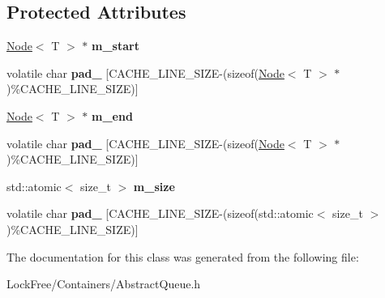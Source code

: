 \subsection*{Protected Attributes}
\begin{DoxyCompactItemize}
\item 
\hypertarget{class_d_x_1_1_lock_free_1_1_queue_afd72533778860258f3cedb4a2a6b6a17}{\hyperlink{struct_d_x_1_1_lock_free_1_1_node}{Node}$<$ T $>$ $\ast$ {\bfseries m\-\_\-start}}\label{class_d_x_1_1_lock_free_1_1_queue_afd72533778860258f3cedb4a2a6b6a17}

\item 
\hypertarget{class_d_x_1_1_lock_free_1_1_queue_a69296c6b2dbdc10eca9ce91c5c5e8696}{volatile char {\bfseries pad\-\_} \mbox{[}C\-A\-C\-H\-E\-\_\-\-L\-I\-N\-E\-\_\-\-S\-I\-Z\-E-\/(sizeof(\hyperlink{struct_d_x_1_1_lock_free_1_1_node}{Node}$<$ T $>$ $\ast$)\%C\-A\-C\-H\-E\-\_\-\-L\-I\-N\-E\-\_\-\-S\-I\-Z\-E)\mbox{]}}\label{class_d_x_1_1_lock_free_1_1_queue_a69296c6b2dbdc10eca9ce91c5c5e8696}

\item 
\hypertarget{class_d_x_1_1_lock_free_1_1_queue_a8e4a95ccaa9cdd92b29ee10ebd3dbe9d}{\hyperlink{struct_d_x_1_1_lock_free_1_1_node}{Node}$<$ T $>$ $\ast$ {\bfseries m\-\_\-end}}\label{class_d_x_1_1_lock_free_1_1_queue_a8e4a95ccaa9cdd92b29ee10ebd3dbe9d}

\item 
\hypertarget{class_d_x_1_1_lock_free_1_1_queue_a97abcd8082dd19a63ead25ef8697a92d}{volatile char {\bfseries pad\-\_} \mbox{[}C\-A\-C\-H\-E\-\_\-\-L\-I\-N\-E\-\_\-\-S\-I\-Z\-E-\/(sizeof(\hyperlink{struct_d_x_1_1_lock_free_1_1_node}{Node}$<$ T $>$ $\ast$)\%C\-A\-C\-H\-E\-\_\-\-L\-I\-N\-E\-\_\-\-S\-I\-Z\-E)\mbox{]}}\label{class_d_x_1_1_lock_free_1_1_queue_a97abcd8082dd19a63ead25ef8697a92d}

\item 
\hypertarget{class_d_x_1_1_lock_free_1_1_queue_a1cf52809012fae94ab715590803ddcd2}{std\-::atomic$<$ size\-\_\-t $>$ {\bfseries m\-\_\-size}}\label{class_d_x_1_1_lock_free_1_1_queue_a1cf52809012fae94ab715590803ddcd2}

\item 
\hypertarget{class_d_x_1_1_lock_free_1_1_queue_ae736270ff54ecf46a650a2399551665a}{volatile char {\bfseries pad\-\_} \mbox{[}C\-A\-C\-H\-E\-\_\-\-L\-I\-N\-E\-\_\-\-S\-I\-Z\-E-\/(sizeof(std\-::atomic$<$ size\-\_\-t $>$)\%C\-A\-C\-H\-E\-\_\-\-L\-I\-N\-E\-\_\-\-S\-I\-Z\-E)\mbox{]}}\label{class_d_x_1_1_lock_free_1_1_queue_ae736270ff54ecf46a650a2399551665a}

\end{DoxyCompactItemize}


The documentation for this class was generated from the following file\-:\begin{DoxyCompactItemize}
\item 
Lock\-Free/\-Containers/Abstract\-Queue.\-h\end{DoxyCompactItemize}
